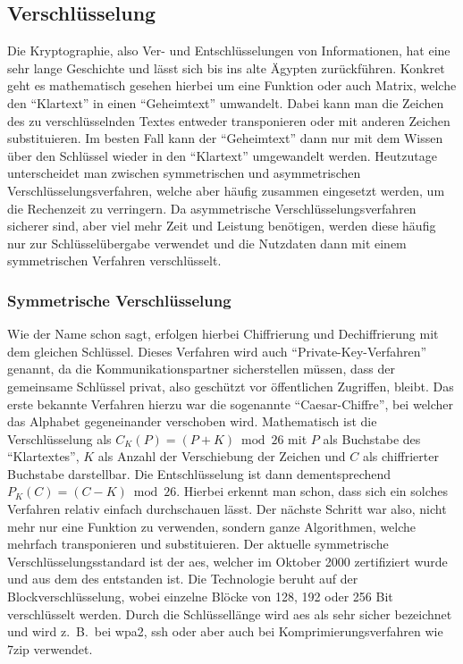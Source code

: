 \subsection{Verschlüsselung}\label{subsec:verschluesselung}
	Die Kryptographie, also Ver- und Entschlüsselungen von Informationen,
	hat eine sehr lange Geschichte und lässt sich bis ins alte Ägypten zurückführen.
	Konkret geht es mathematisch gesehen hierbei um eine Funktion oder auch Matrix,
	welche den \enquote{Klartext} in einen \enquote{Geheimtext} umwandelt.
	Dabei kann man die Zeichen des zu verschlüsselnden Textes entweder transponieren
	oder mit anderen Zeichen substituieren.
	Im besten Fall kann der \enquote{Geheimtext} dann nur mit dem Wissen über den Schlüssel
	wieder in den \enquote{Klartext} umgewandelt werden.
	Heutzutage unterscheidet man zwischen symmetrischen und asymmetrischen Verschlüsselungsverfahren,
	welche aber häufig zusammen eingesetzt werden,
	um die Rechenzeit zu verringern.
	Da asymmetrische Verschlüsselungsverfahren sicherer sind,
	aber viel mehr Zeit und Leistung benötigen,
	werden diese häufig nur zur Schlüsselübergabe verwendet und
	die Nutzdaten dann mit einem symmetrischen Verfahren verschlüsselt.

	\subsubsection{Symmetrische Verschlüsselung}\label{subsubsec:symVersch}
		Wie der Name schon sagt, erfolgen hierbei Chiffrierung und Dechiffrierung mit dem gleichen Schlüssel.
		Dieses Verfahren wird auch \enquote{Private-Key-Verfahren} genannt,
		da die Kommunikationspartner sicherstellen müssen, dass der gemeinsame Schlüssel privat,
		also geschützt vor öffentlichen Zugriffen, bleibt.
		Das erste bekannte Verfahren hierzu war die sogenannte \enquote{Caesar-Chiffre},
		bei welcher das Alphabet gegeneinander verschoben wird.
		Mathematisch ist die Verschlüsselung als $C_{K}(P) = (P + K) \bmod 26$ mit
		$P$ als Buchstabe des \enquote{Klartextes},
		$K$ als Anzahl der Verschiebung der Zeichen und
		$C$ als chiffrierter Buchstabe darstellbar.
		Die Entschlüsselung ist dann dementsprechend~$P_{K}(C) = (C - K) \bmod 26$.
		Hierbei erkennt man schon,
		dass sich ein solches Verfahren relativ einfach durchschauen lässt.
		Der nächste Schritt war also, nicht mehr nur eine Funktion zu verwenden,
		sondern ganze Algorithmen, welche mehrfach transponieren und substituieren.
		Der aktuelle symmetrische Verschlüsselungsstandard ist der \gls{aes},
		welcher im Oktober 2000 zertifiziert wurde und aus dem \gls{des} entstanden ist.
		Die Technologie beruht auf der Blockverschlüsselung,
		wobei einzelne Blöcke von 128, 192 oder 256 Bit verschlüsselt werden.
		Durch die Schlüssellänge wird \gls{aes} als sehr sicher bezeichnet und
		wird z.\ B.\ bei \gls{wpa2}, \gls{ssh} oder aber auch bei Komprimierungsverfahren wie \gls{7zip} verwendet.

